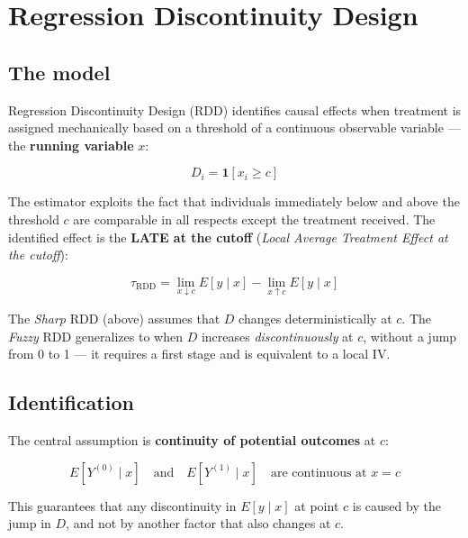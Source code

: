 \chapter{Regression Discontinuity Design}
\label{cap:rdd}

\section{The model}

Regression Discontinuity Design (RDD) identifies causal effects when
treatment is assigned mechanically based on a threshold of a continuous
observable variable --- the \textbf{running variable} $x$:

\[
  D_i = \mathbf{1}[x_i \geq c]
\]

The estimator exploits the fact that individuals immediately below and above the
threshold $c$ are comparable in all respects except the treatment received. The
identified effect is the \textbf{LATE at the cutoff} (\emph{Local Average Treatment
Effect at the cutoff}):

\[
  \tau_{\mathrm{RDD}}
  = \lim_{x \downarrow c} E[y \mid x]
  - \lim_{x \uparrow c} E[y \mid x]
\]

\begin{nota}
  The \emph{Sharp} RDD (above) assumes that $D$ changes deterministically at $c$.
  The \emph{Fuzzy} RDD generalizes to when $D$ increases
  \emph{discontinuously} at $c$, without a jump from 0 to 1 --- it requires a
  first stage and is equivalent to a local IV.
\end{nota}

\section{Identification}

The central assumption is \textbf{continuity of potential outcomes} at
$c$:

\[
  E[Y^{(0)} \mid x] \quad \text{and} \quad E[Y^{(1)} \mid x]
  \quad \text{are continuous at } x = c
\]

This guarantees that any discontinuity in $E[y \mid x]$ at point $c$ is
caused by the jump in $D$, and not by another factor that also changes at $c$.

